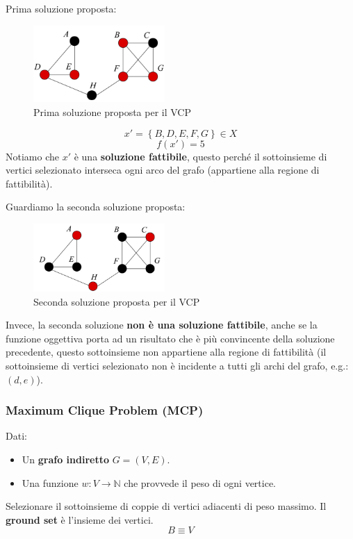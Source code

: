 \documentclass{article}
\begin{document}
Prima soluzione proposta:
\begin{figure}[H]
    \centering
    \includegraphics[width=5cm]{images/VCP_sol1.png}
    \caption{Prima soluzione proposta per il VCP}
    \label{fig:fst_sol_VCP}
\end{figure}

$$x'=\left\{ B,D,E,F,G \right\} \in X$$
$$f(x')=5$$
Notiamo che $x'$ è una \textbf{soluzione fattibile}, questo perché il sottoinsieme di vertici selezionato interseca
ogni arco del grafo (appartiene alla regione di fattibilità).

Guardiamo la seconda soluzione proposta:
\begin{figure}[H]
    \centering
    \includegraphics[width=5cm]{images/VCP_sol2.png}
    \caption{Seconda soluzione proposta per il VCP}
    \label{fig:snd_sol_VCP}
\end{figure}

Invece, la seconda soluzione \textbf{non è una soluzione fattibile}, anche se la funzione oggettiva porta ad un
risultato che è più convincente della soluzione precedente, questo sottoinsieme non appartiene alla regione di
fattibilità (il sottoinsieme di vertici selezionato non è incidente a tutti gli archi del grafo, e.g.: $(d,e)$).

\subsubsection{Maximum Clique Problem (MCP)}
Dati:
\begin{itemize}
    \item Un \textbf{grafo indiretto} $G=(V,E)$.
    \item Una funzione $w:V\rightarrow \mathbb{N}$ che provvede il peso di ogni vertice.
\end{itemize}
Selezionare il sottoinsieme di coppie di vertici adiacenti di peso massimo. Il \textbf{ground set} è l'insieme
dei vertici.
$$B\equiv V$$
\end{document}
